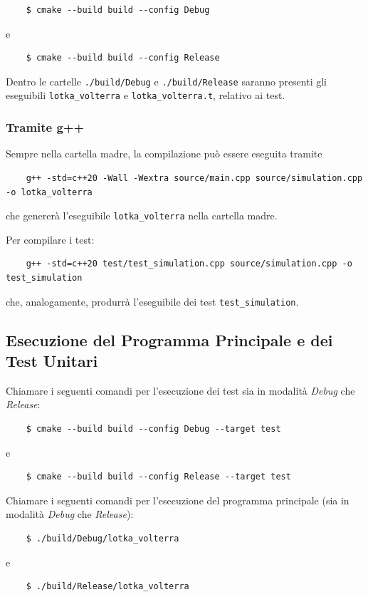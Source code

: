 \begin{verbatim}
    $ cmake --build build --config Debug
\end{verbatim}
e
\begin{verbatim}
    $ cmake --build build --config Release
\end{verbatim}

Dentro le cartelle \verb|./build/Debug| e \verb|./build/Release| saranno presenti gli eseguibili \verb|lotka_volterra| e \verb|lotka_volterra.t|, relativo ai test.

\subsubsection{Tramite g++}
Sempre nella cartella madre, la compilazione può essere eseguita tramite
\begin{verbatim}
    g++ -std=c++20 -Wall -Wextra source/main.cpp source/simulation.cpp -o lotka_volterra
\end{verbatim}

che genererà l'eseguibile \verb|lotka_volterra| nella cartella madre.

Per compilare i test:

\begin{verbatim}
    g++ -std=c++20 test/test_simulation.cpp source/simulation.cpp -o test_simulation
\end{verbatim}

che, analogamente, produrrà l'eseguibile dei test \verb|test_simulation|.

\subsection{Esecuzione del Programma Principale e dei Test Unitari}
Chiamare i seguenti comandi per l'esecuzione dei test sia in modalità \textit{Debug} che \textit{Release}:

\begin{verbatim}
    $ cmake --build build --config Debug --target test
\end{verbatim}

e

\begin{verbatim}
    $ cmake --build build --config Release --target test
\end{verbatim}

Chiamare i seguenti comandi per l'esecuzione del programma principale (sia in modalità \textit{Debug} che \textit{Release}):

\begin{verbatim}
    $ ./build/Debug/lotka_volterra
\end{verbatim}

e

\begin{verbatim}
    $ ./build/Release/lotka_volterra
\end{verbatim}
